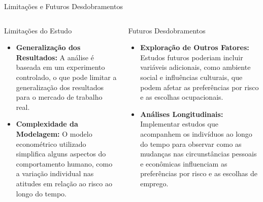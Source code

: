\documentclass[aspectratio=169, xcolor={dvipsnames}, 10pt, brazil]{beamer}
\begin{document}
\begin{frame}{Limitações e Futuros Desdobramentos}
    \begin{columns}
        \begin{block}{Limitações do Estudo}
            \begin{itemize}
                \item \textbf{Generalização dos Resultados:} A análise é baseada em um experimento controlado, o que pode limitar a generalização dos resultados para o mercado de trabalho real.
                \item \textbf{Complexidade da Modelagem:} O modelo econométrico utilizado simplifica alguns aspectos do comportamento humano, como a variação individual nas atitudes em relação ao risco ao longo do tempo.
            \end{itemize}
        \end{block}
        
        \begin{block}{Futuros Desdobramentos}
            \begin{itemize}
                \item \textbf{Exploração de Outros Fatores:} Estudos futuros poderiam incluir variáveis adicionais, como ambiente social e influências culturais, que podem afetar as preferências por risco e as escolhas ocupacionais.
                \item \textbf{Análises Longitudinais:} Implementar estudos que acompanhem os indivíduos ao longo do tempo para observar como as mudanças nas circunstâncias pessoais e econômicas influenciam as preferências por risco e as escolhas de emprego.
            \end{itemize}
        \end{block}
    \end{columns}
\end{frame}
\end{document}
